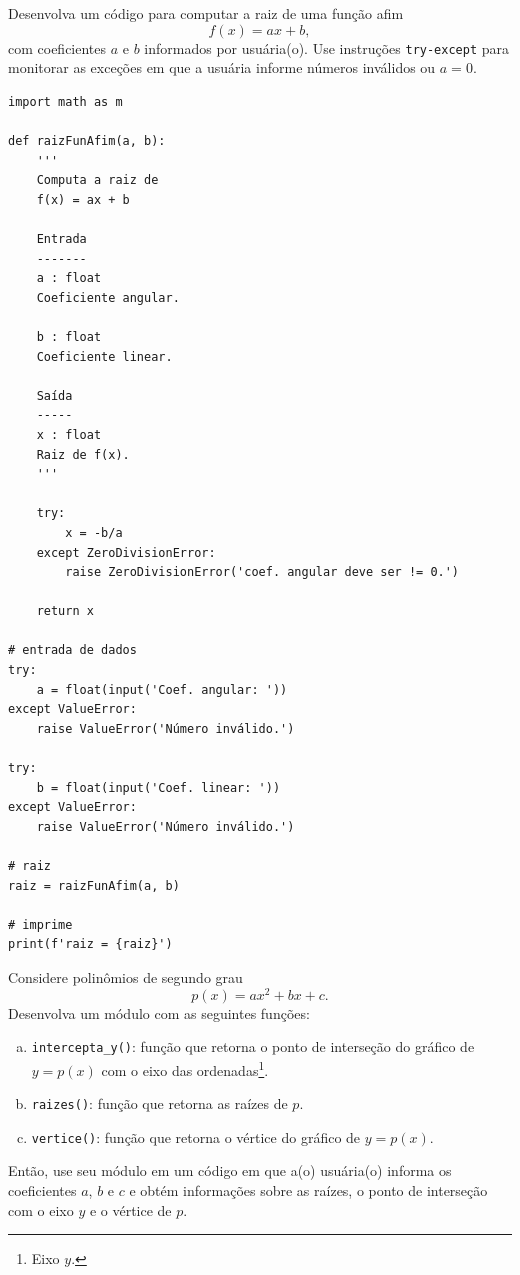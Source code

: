 \begin{exer}
  Desenvolva um código para computar a raiz de uma função afim
  \begin{equation}
    f(x) = ax + b,
  \end{equation}
  com coeficientes $a$ e $b$ informados por usuária(o). Use instruções \lstinline+try-except+ para monitorar as exceções em que a usuária informe números inválidos ou $a=0$.
\end{exer}
\begin{resp}
\begin{lstlisting}
import math as m

def raizFunAfim(a, b):
    '''
    Computa a raiz de
    f(x) = ax + b

    Entrada
    -------
    a : float
    Coeficiente angular.

    b : float
    Coeficiente linear.

    Saída
    -----
    x : float
    Raiz de f(x).
    '''
    
    try:
        x = -b/a
    except ZeroDivisionError:
        raise ZeroDivisionError('coef. angular deve ser != 0.')

    return x

# entrada de dados
try:
    a = float(input('Coef. angular: '))
except ValueError:
    raise ValueError('Número inválido.')

try:
    b = float(input('Coef. linear: '))
except ValueError:
    raise ValueError('Número inválido.')

# raiz
raiz = raizFunAfim(a, b)

# imprime
print(f'raiz = {raiz}')
\end{lstlisting}
\end{resp}

\begin{exer}
  Considere polinômios de segundo grau
  \begin{equation}
    p(x) = ax^2 + bx + c.
  \end{equation}
  Desenvolva um módulo com as seguintes funções:
  \begin{enumerate}[a)]
  \item \lstinline+intercepta_y()+: função que retorna o ponto de interseção do gráfico de $y = p(x)$ com o eixo das ordenadas\footnote{Eixo $y$.}.
  \item \lstinline+raizes()+: função que retorna as raízes de $p$.
  \item \lstinline+vertice()+: função que retorna o vértice do gráfico de $y=p(x)$.
  \end{enumerate}
  Então, use seu módulo em um código em que a(o) usuária(o) informa os coeficientes $a$, $b$ e $c$ e obtém informações sobre as raízes, o ponto de interseção com o eixo $y$ e o vértice de $p$. 
\end{exer}
